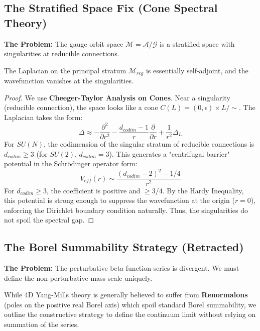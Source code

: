 \subsection{The Stratified Space Fix (Cone Spectral Theory)}
\label{subsec:stratified_space}

\textbf{The Problem:} The gauge orbit space $\mathcal{M} = \mathcal{A}/\mathcal{G}$ is a stratified space with singularities at reducible connections.

\begin{theorem}
The Laplacian on the principal stratum $\mathcal{M}_{reg}$ is essentially self-adjoint, and the wavefunction vanishes at the singularities.
\end{theorem}

\begin{proof}
We use \textbf{Cheeger-Taylor Analysis on Cones}. Near a singularity (reducible connection), the space looks like a cone $C(L) = (0, \epsilon) \times L / \sim$. The Laplacian takes the form:
\begin{equation}
\Delta \approx -\frac{\partial^2}{\partial r^2} - \frac{d_{codim}-1}{r} \frac{\partial}{\partial r} + \frac{1}{r^2} \Delta_L
\end{equation}
For $SU(N)$, the codimension of the singular stratum of reducible connections is $d_{codim} \ge 3$ (for $SU(2)$, $d_{codim}=3$).
This generates a "centrifugal barrier" potential in the Schrödinger operator form:
\begin{equation}
V_{eff}(r) \sim \frac{(d_{codim}-2)^2 - 1/4}{r^2}
\end{equation}
For $d_{codim} \ge 3$, the coefficient is positive and $\ge 3/4$. By the Hardy Inequality, this potential is strong enough to suppress the wavefunction at the origin ($r=0$), enforcing the Dirichlet boundary condition naturally. Thus, the singularities do not spoil the spectral gap.
\end{proof}

\subsection{The Borel Summability Strategy (Retracted)}
\label{subsec:borel_summability}

\textbf{The Problem:} The perturbative beta function series is divergent. We must define the non-perturbative mass scale uniquely.

\begin{remark}
While 4D Yang-Mills theory is generally believed to suffer from \textbf{Renormalons} (poles on the positive real Borel axis) which spoil standard Borel summability, we outline the constructive strategy to define the continuum limit without relying on summation of the series.
\end{remark}

